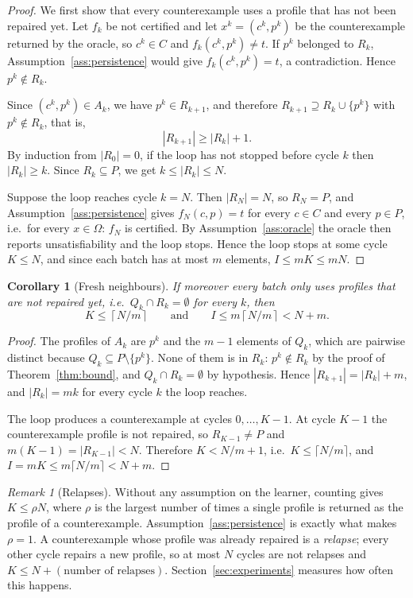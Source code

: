 \documentclass[11pt]{article}
\newtheorem{corollary}[theorem]{Corollary}
\theoremstyle{definition}
\theoremstyle{remark}
\newtheorem{remark}[theorem]{Remark}
\newcommand{\Dom}{\Omega}
\begin{document}
\begin{proof}
We first show that every counterexample uses a profile that has not been repaired yet.
Let $f_k$ be not certified and let $x^k=(c^k,p^k)$ be the counterexample returned by the
oracle, so $c^k\in C$ and $f_k(c^k,p^k)\ne t$.
If $p^k$ belonged to $R_k$, Assumption~\ref{ass:persistence} would give
$f_k(c^k,p^k)=t$, a contradiction.
Hence $p^k\notin R_k$.

Since $(c^k,p^k)\in A_k$, we have $p^k\in R_{k+1}$, and therefore
$R_{k+1}\supseteq R_k\cup\{p^k\}$ with $p^k\notin R_k$, that is,
\[
  |R_{k+1}|\ge |R_k|+1 .
\]
By induction from $|R_0|=0$, if the loop has not stopped before cycle $k$ then
$|R_k|\ge k$.
Since $R_k\subseteq P$, we get $k\le|R_k|\le N$.

Suppose the loop reaches cycle $k=N$.
Then $|R_N|=N$, so $R_N=P$, and Assumption~\ref{ass:persistence} gives $f_N(c,p)=t$ for
every $c\in C$ and every $p\in P$, i.e.\ for every $x\in\Dom$: $f_N$ is certified.
By Assumption~\ref{ass:oracle} the oracle then reports unsatisfiability and the loop
stops.
Hence the loop stops at some cycle $K\le N$, and since each batch has at most $m$
elements, $I\le mK\le mN$.
\end{proof}

\begin{corollary}[Fresh neighbours]\label{cor:fresh}
If moreover every batch only uses profiles that are not repaired yet, i.e.\
$Q_k\cap R_k=\emptyset$ for every $k$, then
\[
  K\le\left\lceil N/m\right\rceil
  \qquad\text{and}\qquad
  I\le m\left\lceil N/m\right\rceil<N+m .
\]
\end{corollary}

\begin{proof}
The profiles of $A_k$ are $p^k$ and the $m-1$ elements of $Q_k$, which are pairwise
distinct because $Q_k\subseteq P\setminus\{p^k\}$.
None of them is in $R_k$: $p^k\notin R_k$ by the proof of Theorem~\ref{thm:bound}, and
$Q_k\cap R_k=\emptyset$ by hypothesis.
Hence $|R_{k+1}|=|R_k|+m$, and $|R_k|=mk$ for every cycle $k$ the loop reaches.

The loop produces a counterexample at cycles $0,\dots,K-1$.
At cycle $K-1$ the counterexample profile is not repaired, so $R_{K-1}\ne P$ and
$m(K-1)=|R_{K-1}|<N$.
Therefore $K<N/m+1$, i.e.\ $K\le\lceil N/m\rceil$, and $I=mK\le m\lceil N/m\rceil<N+m$.
\end{proof}

\begin{remark}[Relapses]\label{rem:relapse}
Without any assumption on the learner, counting gives $K\le\rho N$, where $\rho$ is the
largest number of times a single profile is returned as the profile of a counterexample.
Assumption~\ref{ass:persistence} is exactly what makes $\rho=1$.
A counterexample whose profile was already repaired is a \emph{relapse}; every other cycle
repairs a new profile, so at most $N$ cycles are not relapses and $K\le N+(\text{number of
relapses})$.
Section~\ref{sec:experiments} measures how often this happens.
\end{remark}
\end{document}
